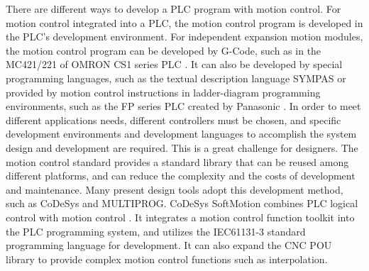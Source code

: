 \documentclass[journal]{IEEEtran}
\begin{document}
There are different ways to develop a PLC program with motion control. For motion control integrated into a PLC, the motion control program is developed in the PLC's development environment. For independent expansion motion modules, the motion control program can be developed by G-Code, such as in the MC421/221 of OMRON CS1 series PLC \cite{OMRON2006}. It can also be developed by special programming languages, such as the textual description language SYMPAS or provided by motion control instructions in ladder-diagram programming environments, such as the FP series PLC created by Panasonic \cite{A24}. In order to meet different applications needs, different controllers must be chosen, and specific development environments and development languages to accomplish the system design and development are required. This is a great challenge for designers. The motion control standard \cite{A12} provides a standard library that can be reused among different platforms, and can reduce the complexity and the costs of development and maintenance. Many present design tools adopt this development method, such as CoDeSys and MULTIPROG. CoDeSys SoftMotion combines PLC logical control with motion control \cite{3S2017}. It integrates a motion control function toolkit into the PLC programming system, and utilizes the IEC61131-3 standard programming language for development. It can also expand the CNC POU library to provide complex motion control functions such as interpolation.
\end{document}
